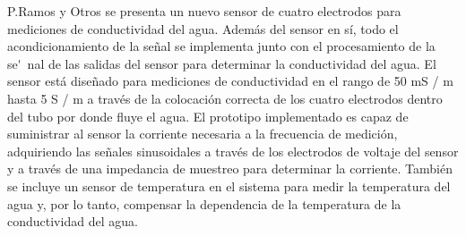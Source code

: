  P.Ramos y Otros \cite{ramos2008four} se presenta un nuevo sensor de cuatro electrodos para mediciones de conductividad del agua. Adem\'as del sensor en s\'i, todo el acondicionamiento de la se\~nal se implementa junto con el procesamiento de la se\'~nal de las salidas del sensor para determinar la conductividad del agua. El sensor est\'a dise\~nado para mediciones de conductividad en el rango de 50 mS / m hasta 5 S / m a trav\'es de la colocaci\'on correcta de los cuatro electrodos dentro del tubo por donde fluye el agua. El prototipo implementado es capaz de suministrar al sensor la corriente necesaria a la frecuencia de medici\'on, adquiriendo las señales sinusoidales a trav\'es de los electrodos de voltaje del sensor y a trav\'es de una impedancia de muestreo para determinar la corriente. Tambi\'en se incluye un sensor de temperatura en el sistema para medir la temperatura del agua y, por lo tanto, compensar la dependencia de la temperatura de la conductividad del agua.